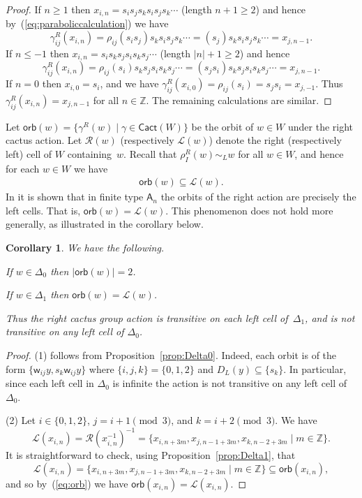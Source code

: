 \documentclass[11pt]{article}
\theoremstyle{plain}
\newtheorem{cor}[thm]{Corollary}
\theoremstyle{definition}
\numberwithin{equation}{section}
\def\cact{\mathsf{Cact}}
\def\sA{\mathsf{A}}
\def\cL{\mathcal{L}}
\def\cR{\mathcal{R}}
\def\ZZ{\mathbb{Z}}
\newcommand{\sw}{\mathsf{w}}
\begin{document}
\begin{proof}
If $n\geq1$ then $x_{i,n}=s_is_js_ks_is_js_k\cdots$ (length $n+1\geq 2$) and hence by~(\ref{eq:paraboliccalculation}) we have
$$
\gamma_{ij}^R(x_{i,n})=\rho_{ij}(s_is_j)s_ks_is_js_k\cdots=(s_j)s_ks_is_js_k\cdots=x_{j,n-1}.
$$
If $n\leq -1$ then $x_{i,n}=s_is_ks_js_is_ks_j\cdots$ (length $|n|+1\geq 2$) and hence 
$$
\gamma_{ij}^R(x_{i,n})=\rho_{ij}(s_i)s_ks_js_is_ks_j\cdots=(s_js_i)s_ks_js_is_ks_j\cdots=x_{j,n-1}.
$$
If $n=0$ then $x_{i,0}=s_i$, and we have $\gamma_{ij}^R(x_{i,0})=\rho_{ij}(s_i)=s_js_i=x_{j,-1}$. Thus $\gamma_{ij}^R(x_{i,n})=x_{j,n-1}$ for all $n\in\ZZ$. The remaining calculations are similar. 
\end{proof}




Let $\mathsf{orb}(w)=\{\gamma^R(w) \mid \gamma\in\cact(W)\}$ be the orbit of $w\in W$ under the right cactus action. Let $\cR(w)$ (respectively $\cL(w)$) denote the right (respectively left) cell of $W$ containing~$w$. Recall that $\rho_I^R(w)\sim_L w$ for all $w\in W$, and hence for each $w\in W$ we have
\begin{align}\label{eq:orb}
\mathsf{orb}(w)\subseteq\cL(w).
\end{align}
In \cite[Theorem~1.1]{Los:19} it is shown that in finite type $\sA_n$ the orbits of the right action are precisely the left cells. That is, $\mathsf{orb}(w)=\cL(w)$. This phenomenon does not hold more generally, as illustrated in the corollary below. 

\begin{cor}
We have the following.
\begin{compactenum}[$(1)$]
\item If $w\in\Delta_0$ then $|\mathsf{orb}(w)|=2$. 
\item If $w\in \Delta_1$ then $\mathsf{orb}(w)=\cL(w)$. 
\end{compactenum}
Thus the right cactus group action is transitive on each left cell of~$\Delta_1$, and is not transitive on any left cell of $\Delta_0$.
\end{cor}

\begin{proof}
(1) follows from Proposition~\ref{prop:Delta0}. Indeed, each orbit is of the form $\{\sw_{ij}y,s_k\sw_{ij}y\}$ where $\{i,j,k\}=\{0,1,2\}$ and $D_L(y)\subseteq\{s_k\}$. In particular, since each left cell in $\Delta_0$ is infinite the action is not transitive on any left cell of $\Delta_0$. 

(2) Let $i\in\{0,1,2\}$, $j=i+1\pmod{3}$, and $k=i+2\pmod{3}$. We have 
$$
\cL(x_{i,n})=\cR(x_{i,n}^{-1})^{-1}=\{x_{i,n+3m},x_{j,n-1+3m},x_{k,n-2+3m}\mid m\in\ZZ\}. 
$$
It is straightforward to check, using Proposition~\ref{prop:Delta1}, that
$$
\cL(x_{i,n})=\{x_{i,n+3m},x_{j,n-1+3m},x_{k,n-2+3m}\mid m\in\ZZ\}\subseteq \mathsf{orb}(x_{i,n}),
$$
and so by~(\ref{eq:orb}) we have $\mathsf{orb}(x_{i,n})=\cL(x_{i,n})$. 
\end{proof}
\end{document}
